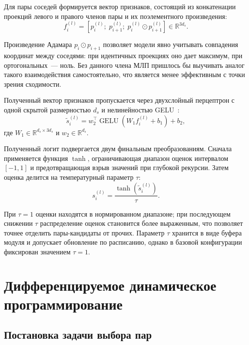 Для пары соседей формируется вектор признаков, состоящий из
конкатенации проекций левого и правого членов пары и их поэлементного
произведения:
\begin{equation}
  f_i^{(l)} = [p_i^{(l)};\; p_{i+1}^{(l)};\; p_i^{(l)} \odot p_{i+1}^{(l)}]
  \in \mathbb{R}^{3 d_s}.
\end{equation}

Произведение Адамара $p_i \odot p_{i+1}$ позволяет модели явно
учитывать совпадения координат между соседями: при идентичных
проекциях оно дает максимум, при ортогональных~--- ноль. Без данного
члена МЛП пришлось бы выучивать аналог такого взаимодействия
самостоятельно, что является менее эффективным с точки зрения
сходимости.

Полученный вектор признаков пропускается через двухслойный перцептрон
с одной скрытой размерностью $d_s$ и нелинейностью
GELU~\cite{hendrycksGaussianErrorLinear2016}:
\begin{equation}
  \tilde s_i^{(l)} = w_2^\top \operatorname{GELU}(W_1 f_i^{(l)} + b_1) + b_2,
\end{equation}
где $W_1 \in \mathbb{R}^{d_s \times 3 d_s}$ и $w_2 \in \mathbb{R}^{d_s}$.

Полученный логит подвергается двум финальным преобразованиям. Сначала
применяется функция $\tanh$, ограничивающая диапазон оценок
интервалом $[-1, 1]$ и предотвращающая взрыв значений при глубокой
рекурсии. Затем оценка делится на температурный параметр $\tau$:
\begin{equation}
  s_i^{(l)} = \frac{\tanh(\tilde s_i^{(l)})}{\tau}.
  \label{eq:final_score}
\end{equation}

При $\tau = 1$ оценки находятся в нормированном диапазоне; при
последующем снижении $\tau$ распределение оценок становится более
выраженным, что позволяет точнее отделить пары-кандидаты от прочих.
Параметр $\tau$ хранится в виде буфера модуля и допускает обновление
по расписанию, однако в базовой конфигурации фиксирован значением
$\tau = 1$.

\section{Дифференцируемое динамическое программирование}

\subsection{Постановка задачи выбора пар}

